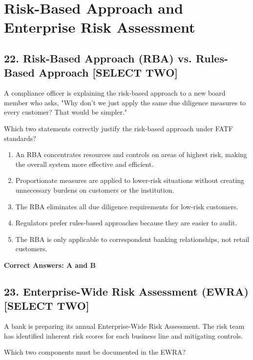 \documentclass[11pt,a4paper]{article}
\begin{document}
	\section{Risk-Based Approach and Enterprise Risk Assessment}
	
	\subsection{22. Risk-Based Approach (RBA) vs. Rules-Based Approach \textnormal{[SELECT TWO]}}
	
	A compliance officer is explaining the risk-based approach to a new board member who asks, "Why don't we just apply the same due diligence measures to every customer? That would be simpler."
	
	Which two statements correctly justify the risk-based approach under FATF standards?
	
	\begin{enumerate}[label=\Alph*.]
		\item An RBA concentrates resources and controls on areas of highest risk, making the overall system more effective and efficient.
		\item Proportionate measures are applied to lower-risk situations without creating unnecessary burdens on customers or the institution.
		\item The RBA eliminates all due diligence requirements for low-risk customers.
		\item Regulators prefer rules-based approaches because they are easier to audit.
		\item The RBA is only applicable to correspondent banking relationships, not retail customers.
	\end{enumerate}
	
	\textbf{Correct Answers: A and B}
	
	\subsection{23. Enterprise-Wide Risk Assessment (EWRA) \textnormal{[SELECT TWO]}}
	
	A bank is preparing its annual Enterprise-Wide Risk Assessment. The risk team has identified inherent risk scores for each business line and mitigating controls.
	
	Which two components must be documented in the EWRA?
	
\end{document}

